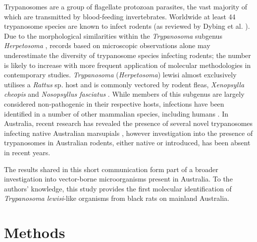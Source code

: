 \documentclass[a4paper, nobind]{templates/ociamthesis}
\begin{document}
Trypanosomes are a group of flagellate protozoan parasites, the vast majority of which are transmitted by blood-feeding invertebrates. Worldwide at least 44 trypanosome species are known to infect rodents (as reviewed by Dybing et al. \autocite*{dybingGhostsChristmasAbsence2016}). Due to the morphological similarities within the \emph{Trypanosoma} subgenus \emph{Herpetosoma} \autocite{maiadasilvaPhylogeneticMorphologicalBehavioural2010,ortizDiagnosisGeneticAnalysis2018}, records based on microscopic observations alone may underestimate the diversity of trypanosome species infecting rodents; the number is likely to increase with more frequent application of molecular methodologies in contemporary studies. \emph{Trypanosoma} (\emph{Herpetosoma}) lewisi almost exclusively utilises a \emph{Rattus} sp. host and is commonly vectored by rodent fleas, \emph{Xenopsylla cheopis} and \emph{Nosopsyllus fasciatus} \autocite{ortizDiagnosisGeneticAnalysis2018}. While members of this subgenus are largely considered non-pathogenic in their respective hosts, infections have been identified in a number of other mammalian species, including humans \autocite{maiadasilvaPhylogeneticMorphologicalBehavioural2010,ortizDiagnosisGeneticAnalysis2018}. In Australia, recent research has revealed the presence of several novel trypanosomes infecting native Australian marsupials \autocite{thompsonTrypanosomesAustralianMammals2014}, however investigation into the presence of trypanosomes in Australian rodents, either native or introduced, has been absent in recent years.

The results shared in this short communication form part of a broader investigation into vector-borne microorganisms present in Australia. To the authors' knowledge, this study provides the first molecular identification of \emph{Trypanosoma lewisi}-like organisms from black rats on mainland Australia.

\hypertarget{methods-3}{%
\section{Methods}\label{methods-3}}
\end{document}
